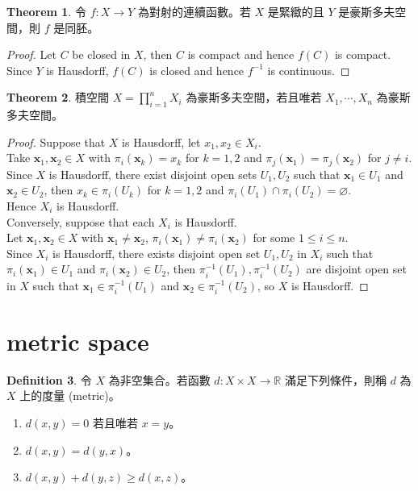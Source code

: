 \documentclass[12pt]{article}
\theoremstyle{definition}
\newtheorem{definition}{Definition}[section]
\newtheorem{theorem}[definition]{Theorem}
\newcommand\<{\langle}
\renewcommand\>{\rangle}
\begin{document}
\begin{CJK}{UTF8}{bsmi}
\begin{theorem}
\label{homeomorphism from compact to Hausdorff}
    令 $f:X\to Y$ 為對射的連續函數。若 $X$ 是緊緻的且 $Y$ 是豪斯多夫空間，則 $f$ 是同胚。
\end{theorem}
\begin{proof}
    Let $C$ be closed in $X$, then $C$ is compact and hence $f(C)$ is compact. \\
    Since $Y$ is Hausdorff, $f(C)$ is closed and hence $f^{-1}$ is continuous.
\end{proof}

\begin{theorem}
    積空間 $X=\prod_{i=1}^n X_i$ 為豪斯多夫空間，若且唯若 $X_1, \cdots, X_n$ 為豪斯多夫空間。
\end{theorem}
\begin{proof}
    Suppose that $X$ is Hausdorff, let $x_1, x_2\in X_i$. \\
    Take $\textbf{x}_1, \textbf{x}_2\in X$ with $\pi_i(\textbf{x}_k)=x_k$ for $k=1, 2$ and $\pi_j(\textbf{x}_1)=\pi_j(\textbf{x}_2)$ for $j\ne i$. \\
    Since $X$ is Hausdorff, there exist disjoint open sets $U_1, U_2$ such that $\textbf{x}_1\in U_1$ and $\textbf{x}_2\in U_2$, then $x_k\in\pi_i(U_k)$ for $k=1, 2$ and $\pi_i(U_1)\cap\pi_i(U_2)=\varnothing$. \\
    Hence $X_i$ is Hausdorff. \\
    Conversely, suppose that each $X_i$ is Hausdorff. \\
    Let $\textbf{x}_1, \textbf{x}_2\in X$ with $\textbf{x}_1\ne\textbf{x}_2$, $\pi_i(\textbf{x}_1)\ne\pi_i(\textbf{x}_2)$ for some $1\le i\le n$. \\
    Since $X_i$ is Hausdorff, there exists disjoint open set $U_1, U_2$ in $X_i$ such that $\pi_i(\textbf{x}_1)\in U_1$ and $\pi_i(\textbf{x}_2)\in U_2$, then $\pi_i^{-1}(U_1), \pi_i^{-1}(U_2)$ are disjoint open set in $X$ such that $\textbf{x}_1\in\pi_i^{-1}(U_1)$ and $\textbf{x}_2\in\pi_i^{-1}(U_2)$, so $X$ is Hausdorff.
\end{proof}

\section{metric space}

\begin{definition}
    令 $X$ 為非空集合。若函數 $d:X\times X\to\mathbb{R}$ 滿足下列條件，則稱 $d$ 為 $X$ 上的度量 (metric)。
    \begin{enumerate}
        \item $d(x, y)=0$ 若且唯若 $x=y$。
        \item $d(x, y)=d(y, x)$。
        \item $d(x, y)+d(y, z)\ge d(x, z)$。
    \end{enumerate}
\end{definition}


\end{CJK}
\end{document}
